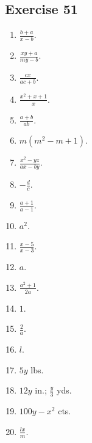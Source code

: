 \documentclass{book}
\begin{document}
\subsection*{Exercise 51}
\begin{enumerate}

\item $\displaystyle \frac{b+a}{x-b}$.

\item $\displaystyle \frac{xy+a}{my-b}$.

\item $\displaystyle \frac{cx}{ac+b}$.

\item $\displaystyle \frac{x^2+x+1}{x}$.

\item $\displaystyle \frac{a+b}{ab}$.

\item $m(m^2-m+1)$.

\item $\displaystyle \frac{x^2-yz}{ax-by}$.

\item $\displaystyle -\frac{d}{c}$.

\item $\displaystyle \frac{a+1}{a-1}$.

\item $a^2$.

\item $\displaystyle \frac{x-5}{x-3}$.

\item $a$.

\item $\displaystyle \frac{a^2+1}{2a}$.

\item $1$.

\item $\displaystyle \frac{2}{a}$.

\item $l$.

\item $5y$ lbs.

\item $12y$ in.; $\displaystyle \frac{y}{3}$ yds.

\item $100y-x^2$ cts.

\item $\displaystyle \frac{lx}{m}$.
\end{enumerate}
\end{document}
